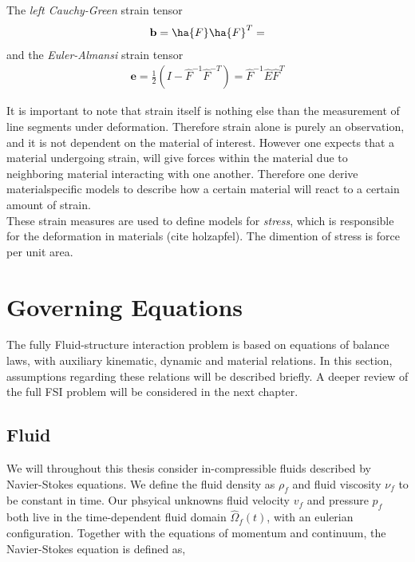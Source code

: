 The \textit{left Cauchy-Green} strain tensor 
\begin{align*}
\mathbf{b} = \ha{F} \ha{F}^T = 
\end{align*}
and the \textit{Euler-Almansi} strain tensor
\begin{align*}
\mathbf{e} = \frac{1}{2} (I - \hat{F}^{-1}\hat{F}^{-T}) = \hat{F}^{-1}\hat{E}\hat{F}^{T}
\end{align*}

It is important to note that strain itself is nothing else than the measurement of line segments under deformation. Therefore strain alone is purely an observation, and it is not dependent on the material of interest. However one expects that a material undergoing strain, will give  forces within the material due to neighboring material interacting with one another. Therefore one derive materialspecific models to describe how a certain material will react to a certain amount of strain.\\
These strain measures are used to define models for \textit{stress}, which is responsible for the deformation in materials (cite holzapfel). The dimention of stress is force per unit area.

\section{Governing Equations}
The fully Fluid-structure interaction problem is based on equations of balance laws, with auxiliary kinematic, dynamic and material relations. In this section, assumptions regarding these relations will be described briefly. A deeper review of the full FSI problem will be considered in the next chapter. 

\subsection{Fluid}
We will throughout this thesis consider in-compressible fluids described by Navier-Stokes equations. We define the fluid density as $\rho_f$ and fluid viscosity $\nu_f$ to be constant in time. Our phsyical unknowns
fluid velocity $v_f$ and pressure $p_f$ both live in the time-dependent fluid domain  $\hat{\Omega}_f(t)$, with an eulerian configuration. Together with the equations of momentum and continuum, the Navier-Stokes equation is defined as,

